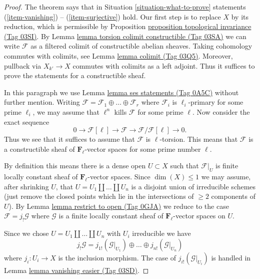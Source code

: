 \documentclass{amsart}
\theoremstyle{plain}
\theoremstyle{definition}
\theoremstyle{remark}
\numberwithin{equation}{subsection}
\begin{document}
\begin{proof}
The theorem says that in Situation \ref{situation-what-to-prove}
statements (\ref{item-vanishing}) -- (\ref{item-surjective}) hold.
Our first step is to replace $X$ by its reduction, which is permissible
by Proposition \href{https://stacks.math.columbia.edu/tag/03SI}{proposition topological invariance (Tag 03SI)}.
By Lemma \href{https://stacks.math.columbia.edu/tag/03SA}{lemma torsion colimit constructible (Tag 03SA)} we can write
$\mathcal{F}$ as a filtered colimit of constructible abelian sheaves.
Taking cohomology commutes with colimits, see Lemma \href{https://stacks.math.columbia.edu/tag/03Q5}{lemma colimit (Tag 03Q5)}.
Moreover, pullback via $X_{k'} \to X$ commutes with colimits as a left
adjoint. Thus it suffices to prove the statements for a constructible sheaf.

\medskip\noindent
In this paragraph we use Lemma \href{https://stacks.math.columbia.edu/tag/0A5C}{lemma ses statements (Tag 0A5C)} without further
mention. Writing
$\mathcal{F} = \mathcal{F}_1 \oplus \ldots \oplus \mathcal{F}_r$
where $\mathcal{F}_i$ is $\ell_i$-primary for some prime $\ell_i$, we may
assume that $\ell^n$ kills $\mathcal{F}$ for some prime $\ell$. Now consider
the exact sequence
$$
0 \to \mathcal{F}[\ell] \to \mathcal{F} \to \mathcal{F}/\mathcal{F}[\ell] \to 0.
$$
Thus we see that it suffices to assume that $\mathcal{F}$ is $\ell$-torsion.
This means that $\mathcal{F}$ is a constructible sheaf of
$\mathbf{F}_\ell$-vector spaces for some prime number $\ell$.

\medskip\noindent
By definition this means there is a dense open $U \subset X$
such that $\mathcal{F}|_U$ is finite locally constant sheaf of
$\mathbf{F}_\ell$-vector spaces. Since $\dim(X) \leq 1$ we may
assume, after shrinking $U$, that $U = U_1 \amalg \ldots \amalg U_n$
is a disjoint union of irreducible schemes (just remove the closed
points which lie in the intersections of $\geq 2$ components of $U$).
By Lemma \href{https://stacks.math.columbia.edu/tag/0GJA}{lemma restrict to open (Tag 0GJA)} we reduce to the case
$\mathcal{F} = j_!\mathcal{G}$ where $\mathcal{G}$ is a finite
locally constant sheaf of $\mathbf{F}_\ell$-vector spaces on $U$.

\medskip\noindent
Since we chose $U = U_1 \amalg \ldots \amalg U_n$ with $U_i$ irreducible
we have
$$
j_!\mathcal{G} =
j_{1!}(\mathcal{G}|_{U_1}) \oplus \ldots \oplus
j_{n!}(\mathcal{G}|_{U_n})
$$
where $j_i : U_i \to X$ is the inclusion morphism.
The case of $j_{i!}(\mathcal{G}|_{U_i})$ is handled in
Lemma \href{https://stacks.math.columbia.edu/tag/03SD}{lemma vanishing easier (Tag 03SD)}.
\end{proof}
\end{document}
